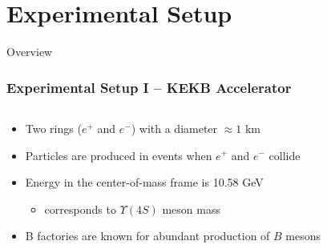 \documentclass[serif]{beamer}
\begin{document}
\section{Experimental Setup} 

\begin{frame}[t]{Overview}
\end{frame}


\begin{frame}[t]
\frametitle{Experimental Setup I -- KEKB Accelerator}
\vspace{-3mm}
\small

\begin{columns}
	\begin{block}{}
		\begin{itemize}
			\item Two rings ($e^+$ and $e^-$) with a diameter $ \approx 1$ km
			\item Particles are produced in events when $e^+$ and $e^-$ collide
			\item Energy in the center-of-mass frame is 10.58 GeV
			\begin{itemize}
				\item corresponds to $\Upsilon(4S)$ meson mass
			\end{itemize}
			\item B factories are known for abundant production of $B$ mesons
		\end{itemize}
	\end{block}
	

\end{columns}
\end{frame}
\end{document}
